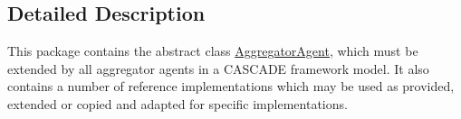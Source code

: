 \subsection{Detailed Description}
This package contains the abstract class \hyperlink{classuk_1_1ac_1_1dmu_1_1iesd_1_1cascade_1_1agents_1_1aggregators_1_1_aggregator_agent}{Aggregator\-Agent}, which must be extended by all aggregator agents in a C\-A\-S\-C\-A\-D\-E framework model. It also contains a number of reference implementations which may be used as provided, extended or copied and adapted for specific implementations. 